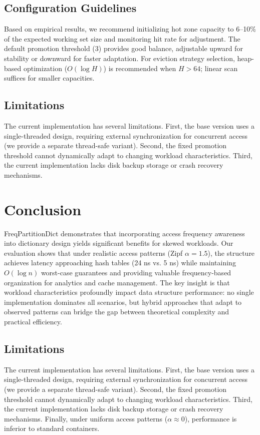 \documentclass[11pt,a4paper]{article}
\begin{document}
\subsection{Configuration Guidelines}

Based on empirical results, we recommend initializing hot zone capacity to 6--10\% of the expected working set size and monitoring hit rate for adjustment. The default promotion threshold (3) provides good balance, adjustable upward for stability or downward for faster adaptation. For eviction strategy selection, heap-based optimization ($O(\log H)$) is recommended when $H > 64$; linear scan suffices for smaller capacities.

\subsection{Limitations}

The current implementation has several limitations. First, the base version uses a single-threaded design, requiring external synchronization for concurrent access (we provide a separate thread-safe variant). Second, the fixed promotion threshold cannot dynamically adapt to changing workload characteristics. Third, the current implementation lacks disk backup storage or crash recovery mechanisms.

\section{Conclusion}

FreqPartitionDict demonstrates that incorporating access frequency awareness into dictionary design yields significant benefits for skewed workloads. Our evaluation shows that under realistic access patterns (Zipf $\alpha = 1.5$), the structure achieves latency approaching hash tables (24 ns vs. 5 ns) while maintaining $O(\log n)$ worst-case guarantees and providing valuable frequency-based organization for analytics and cache management. The key insight is that workload characteristics profoundly impact data structure performance: no single implementation dominates all scenarios, but hybrid approaches that adapt to observed patterns can bridge the gap between theoretical complexity and practical efficiency.

\subsection{Limitations}

The current implementation has several limitations. First, the base version uses a single-threaded design, requiring external synchronization for concurrent access (we provide a separate thread-safe variant). Second, the fixed promotion threshold cannot dynamically adapt to changing workload characteristics. Third, the current implementation lacks disk backup storage or crash recovery mechanisms. Finally, under uniform access patterns ($\alpha \approx 0$), performance is inferior to standard containers.
\end{document}
